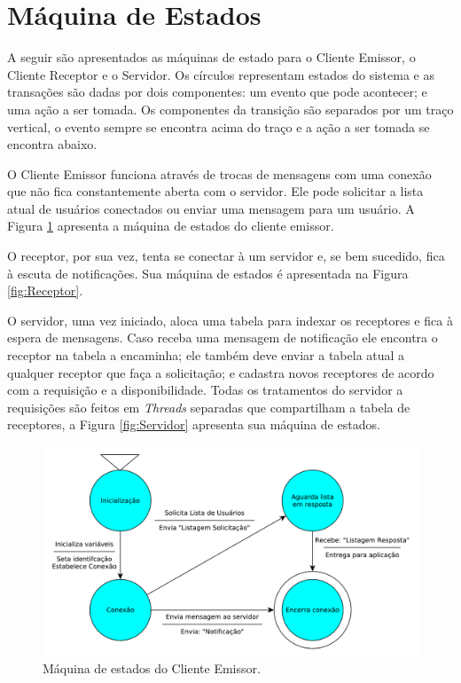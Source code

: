 \documentclass[12pt]{article}
\begin{document}
\section{Máquina de Estados}\label{sec:MaquinaDeEstados}

A seguir são apresentados as máquinas de estado para o
Cliente Emissor,
o Cliente Receptor e
o Servidor.
Os círculos representam estados do sistema e
as transações são dadas por dois componentes:
um evento que pode acontecer;
e uma ação a ser tomada.
Os componentes da transição são separados por um traço vertical,
o evento sempre se encontra acima do traço e
a ação a ser tomada se encontra abaixo.

O Cliente Emissor funciona através de trocas de mensagens com uma conexão que não fica constantemente aberta com o servidor.
Ele pode solicitar a lista atual de usuários conectados ou enviar uma mensagem para um usuário.
A Figura \ref{fig:Emissor} apresenta a máquina de estados do cliente emissor.

O receptor, por sua vez, tenta se conectar à um servidor e,
se bem sucedido,
fica à escuta de notificações.
Sua máquina de estados é apresentada na Figura \ref{fig:Receptor}.

O servidor, uma vez iniciado,
aloca uma tabela para indexar os receptores e fica à espera de mensagens.
Caso receba uma mensagem de notificação ele encontra o receptor na tabela a encaminha;
ele também deve enviar a tabela atual a qualquer receptor que faça a solicitação;
e cadastra novos receptores de acordo com a requisição e a disponibilidade.
Todas os tratamentos do servidor a requisições são feitos em {\it Threads} separadas que compartilham a tabela de receptores,
a Figura \ref{fig:Servidor} apresenta sua máquina de estados.

\begin{figure}%
	\centering
	\includegraphics[width=1\textwidth]{images/Protocolo_Cliente_Emissor.pdf}
	\caption{Máquina de estados do Cliente Emissor.}
	\label{fig:Emissor}
\end{figure}
\end{document}
